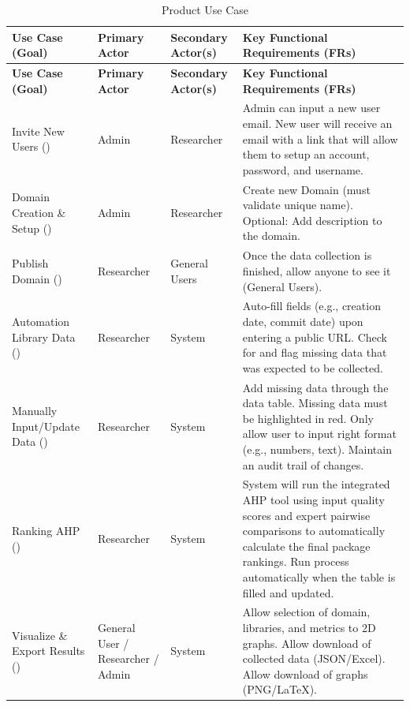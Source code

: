 \documentclass[12pt]{article}
\begin{document}
\begin{longtable}{|p{2cm}|p{2cm}|p{2cm}|p{7cm}|}
\caption{Product Use Case} \\ \hline
\toprule
\textbf{Use Case (Goal)} & \textbf{Primary Actor} & \textbf{Secondary Actor(s)} & \textbf{Key Functional Requirements (FRs)} \\ \hline
\midrule
\endfirsthead
\hline
\toprule
\textbf{Use Case (Goal)} & \textbf{Primary Actor} & \textbf{Secondary Actor(s)} & \textbf{Key Functional Requirements (FRs)} \\ \hline
\midrule
\endhead
\hline
\endfoot
\bottomrule
\endlastfoot
Invite New Users  (\nameref{goal-collab}) & Admin & Researcher & Admin can input a new user email. New user will receive an email with a link that will allow them to setup an account, password, and username. \\  \hline
Domain Creation \& Setup  (\nameref{goal-central-data}) & Admin & Researcher & Create new Domain (must validate unique name). Optional: Add description to the domain. \\  \hline
Publish Domain  (\nameref{goal-central-data}) & Researcher & General Users & Once the data collection is finished, allow anyone to see it (General Users). \\  \hline
Automation Library Data (\nameref{goal-auto-data})  & Researcher & System & Auto-fill fields (e.g., creation date, commit date) upon entering a public URL. Check for and flag missing data that was expected to be collected. \\  \hline
Manually Input/Update Data  (\nameref{goal-data-table}) & Researcher & System & Add missing data through the data table. Missing data must be highlighted in red. Only allow user to input right format (e.g., numbers, text). Maintain an audit trail of changes. \\  \hline
Ranking AHP (\nameref{goal-auto-ahp})  & Researcher & System & System will run the integrated AHP tool using input quality scores and expert pairwise comparisons to automatically calculate the final package rankings. Run process automatically when the table is filled and updated. \\  \hline
Visualize \& Export Results (\nameref{goal-visual}) & General User / Researcher / Admin & System & Allow selection of domain, libraries, and metrics to 2D graphs. Allow download of collected data (JSON/Excel). Allow download of graphs (PNG/LaTeX). \\  \hline
\end{longtable}
\end{document}
